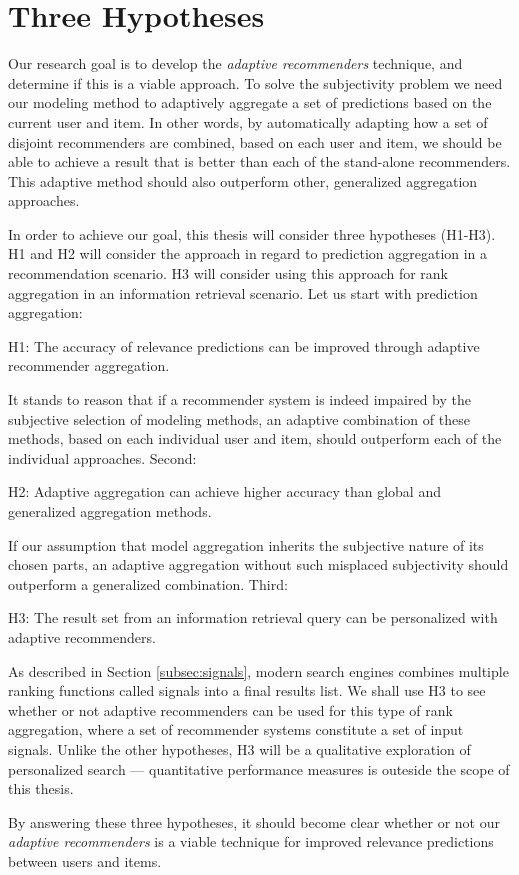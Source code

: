 \section{Three Hypotheses}
\label{sec:hypotheses}

Our research goal is to develop the \emph{adaptive recommenders} technique, and determine if this is a viable approach.
To solve the subjectivity problem we need our modeling method
to adaptively aggregate a set of predictions based on the current user and item.
In other words, by automatically adapting how a set of disjoint recommenders
are combined, based on each user and item, we should be able to achieve a
result that is better than each of the stand-alone recommenders.
This adaptive method should also outperform other, generalized aggregation approaches.

In order to achieve our goal, this thesis will consider three hypotheses (H1-H3).
H1 and H2 will consider the approach in regard to prediction aggregation
in a recommendation scenario. H3 will consider using this approach for
rank aggregation in an information retrieval scenario.
Let us start with prediction aggregation:

\begin{blockquote}
  H1: The accuracy of relevance predictions can be improved
  through adaptive recommender aggregation.
\end{blockquote}
%
It stands to reason that if a recommender system is indeed impaired
by the subjective selection of modeling methods,
an adaptive combination of these methods, based on each individual user and item, 
should outperform each of the individual approaches.
Second:

\begin{blockquote}
  H2: Adaptive aggregation can achieve higher accuracy than global and generalized aggregation methods.
\end{blockquote}
%
If our assumption that model aggregation inherits the subjective nature of its chosen parts,
an adaptive aggregation without such misplaced subjectivity should outperform a
generalized combination.
Third:

\begin{blockquote}
  H3: The result set from an information retrieval query
  can be personalized with adaptive recommenders.
\end{blockquote}
%
As described in Section \ref{subsec:signals},
modern search engines combines multiple ranking functions called signals into a final results list.
We shall use H3 to see whether or not adaptive recommenders can be used for this type of rank aggregation,
where a set of recommender systems constitute a set of input signals.
Unlike the other hypotheses, H3 will be a qualitative exploration of personalized search ---
quantitative performance measures is outeside the scope of this thesis.

By answering these three hypotheses, it should become clear whether or not
our \emph{adaptive recommenders} is a viable technique for improved relevance predictions
between users and items.


